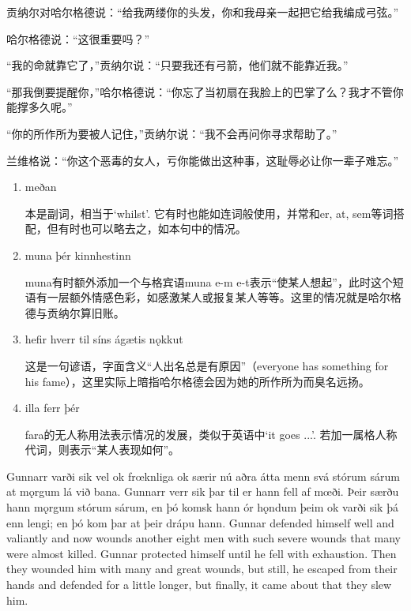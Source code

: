 \begin{translation*}{}
  贡纳尔对哈尔格德说：“给我两缕你的头发，你和我母亲一起把它给我编成弓弦。”

  哈尔格德说：“这很重要吗？”

  “我的命就靠它了，”贡纳尔说：“只要我还有弓箭，他们就不能靠近我。”

  “那我倒要提醒你，”哈尔格德说：“你忘了当初扇在我脸上的巴掌了么？我才不管你能撑多久呢。”

  “你的所作所为要被人记住，”贡纳尔说：“我不会再问你寻求帮助了。”

  兰维格说：“你这个恶毒的女人，亏你能做出这种事，这耻辱必让你一辈子难忘。”
\end{translation*}
\begin{grammar*}{}
  \begin{enumerate}[leftmargin=*]
    \item meðan

          本是副词，相当于`whilst'. 它有时也能如连词般使用，并常和er, at, sem等词搭配，但有时也可以略去之，如本句中的情况。

    \item muna þér kinnhestinn

          muna有时额外添加一个与格宾语muna e-m e-t表示“使某人想起”，此时这个短语有一层额外情感色彩，如感激某人或报复某人等等。这里的情况就是哈尔格德与贡纳尔算旧账。

    \item hefir hverr til síns ágætis nǫkkut

          这是一句谚语，字面含义“人出名总是有原因”（everyone has something for his fame），这里实际上暗指哈尔格德会因为她的所作所为而臭名远扬。

    \item illa ferr þér

          fara的无人称用法表示情况的发展，类似于英语中`it goes ...'. 若加一属格人称代词，则表示“某人表现如何”。
  \end{enumerate}
\end{grammar*}
\begin{paracol}{2}
  Gunnarr varði sik vel ok frœknliga ok særir nú aðra átta menn svá stórum sárum at mǫrgum lá við bana. Gunnarr verr sik þar til er hann fell af mœði. Þeir særðu hann mǫrgum stórum sárum, en þó komsk hann ór hǫndum þeim ok varði sik þá enn lengi; en þó kom þar at þeir drápu hann.
  \switchcolumn
  Gunnar defended himself well and valiantly and now wounds another eight men with such severe wounds that many were almost killed. Gunnar protected himself until he fell with exhaustion. Then they wounded him with many and great wounds, but still, he escaped from their hands and defended for a little longer, but finally, it came about that they slew him.
\end{paracol}
